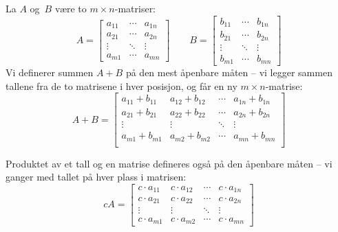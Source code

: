 La $A$ og~$B$ være to $m \times n$-matriser:
\[
A =
\begin{bmatrix}
a_{11} & \cdots & a_{1n} \\
a_{21} & \cdots & a_{2n} \\
\vdots & \ddots & \vdots \\
a_{m1} & \cdots & a_{mn}
\end{bmatrix}
\qquad
B =
\begin{bmatrix}
b_{11} & \cdots & b_{1n} \\
b_{21} & \cdots & b_{2n} \\
\vdots & \ddots & \vdots \\
b_{m1} & \cdots & b_{mn}
\end{bmatrix}
\]
Vi definerer summen $A+B$ på den mest åpenbare måten -- vi legger
sammen tallene fra de to matrisene i hver posisjon, og får en ny
$m \times n$-matrise:
\[
A + B =
\begin{bmatrix}
a_{11} + b_{11} & a_{12} + b_{12} & \cdots & a_{1n} + b_{1n} \\
a_{21} + b_{21} & a_{22} + b_{22} & \cdots & a_{2n} + b_{2n} \\
\vdots          & \vdots          & \ddots & \vdots          \\
a_{m1} + b_{m1} & a_{m2} + b_{m2} & \cdots & a_{mn} + b_{mn} \\
\end{bmatrix}
\]

Produktet av et tall og en matrise defineres også på den åpenbare
måten -- vi ganger med tallet på hver plass i matrisen:
\[
c A =
\begin{bmatrix}
c \cdot a_{11} & c \cdot a_{12} & \cdots & c \cdot a_{1n} \\
c \cdot a_{21} & c \cdot a_{22} & \cdots & c \cdot a_{2n} \\
\vdots         & \vdots         & \ddots & \vdots         \\
c \cdot a_{m1} & c \cdot a_{m2} & \cdots & c \cdot a_{mn}
\end{bmatrix}
\]

